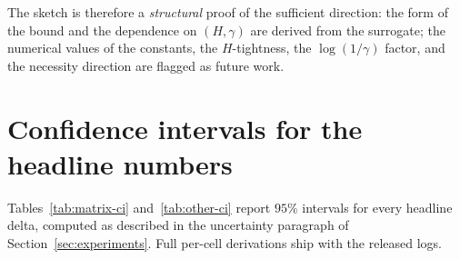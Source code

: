 \documentclass{article}
\begin{document}
The sketch is therefore a \emph{structural} proof of the sufficient
direction: the form of the bound and the dependence on $(H, \gamma)$
are derived from the surrogate; the numerical values of the constants,
the $H$-tightness, the $\log(1/\gamma)$ factor, and the necessity
direction are flagged as future work.

\section{Confidence intervals for the headline numbers}
\label{app:ci}

Tables~\ref{tab:matrix-ci} and~\ref{tab:other-ci} report $95\%$ intervals
for every headline delta, computed as described in the uncertainty
paragraph of Section~\ref{sec:experiments}. Full per-cell derivations ship
with the released logs.
\end{document}
